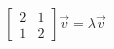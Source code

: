 \documentclass[preview]{standalone}
\begin{document}
\begin{align*}
\begin{bmatrix} 2 & 1 \\ 1 & 2 \end{bmatrix} \vec{v} = \lambda \vec{v}
\end{align*}
\end{document}
